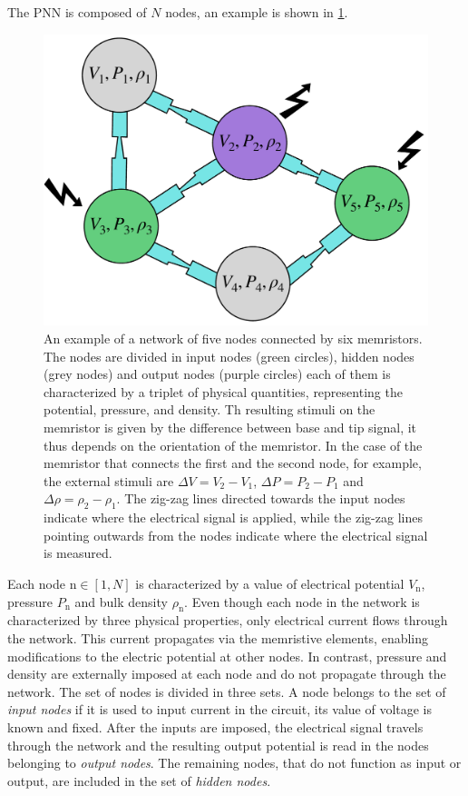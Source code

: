 \documentclass[reprint,superscriptaddress,prb,showkeys]{revtex4-2}
\newcommand{\n}{\text{n}} %
\begin{document}
The PNN is composed of $N$ nodes, an example is shown in \cref{fig:memristor_network}. 
\begin{figure}[t]
    \centering
    \includegraphics[width=0.6\columnwidth]{plots/memristor/memristor_network.pdf}
    \caption{An example of a network of five nodes connected by six memristors. The nodes are divided in input nodes (green circles), hidden nodes (grey nodes) and output nodes (purple circles) each of them is characterized by a triplet of physical quantities, representing the potential, pressure, and density. Th resulting stimuli on the memristor is given by the difference between base and tip signal, it thus depends on the orientation of the memristor. In the case of the memristor that connects the first and the second node, for example, the external stimuli are $\Delta V = V_2 - V_1$, $\Delta P = P_2 - P_1$ and $\Delta \rho = \rho_2 - \rho_1$. The zig-zag lines directed towards the input nodes indicate where the electrical signal is applied, while the zig-zag lines pointing outwards from the nodes indicate where the electrical signal is measured.}
    \label{fig:memristor_network}
\end{figure} 
Each node $\n\in[1,N]$ is characterized by a value of electrical potential $V_{\n}$, pressure $P_{\n}$ and bulk density $\rho_{\n}$. Even though each node in the network is characterized by three physical properties, only electrical current flows through the network. This current propagates via the memristive elements, enabling modifications to the electric potential at other nodes. In contrast, pressure and density are externally imposed at each node and do not propagate through the network. The set of nodes is divided in three sets. A node belongs to the set of \textit{input nodes} if it is used to input current in the circuit, its value of voltage is known and fixed. After the inputs are imposed, the electrical signal travels through the network and the resulting output potential is read in the nodes belonging to \textit{output nodes}. The remaining nodes, that do not function as input or output, are included in the set of \textit{hidden nodes}.
\end{document}

